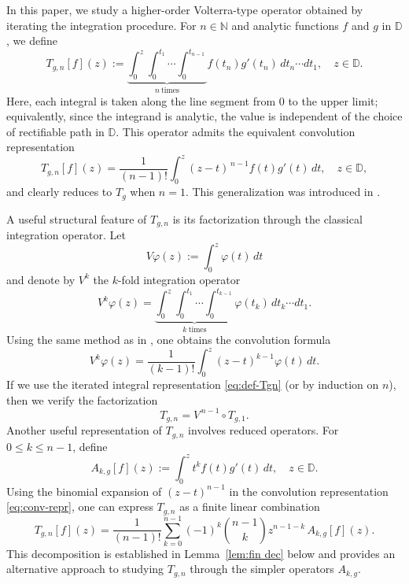 \documentclass[preprint,12pt]{elsarticle}
\numberwithin{equation}{section}
\theoremstyle{remark}
\begin{document}
In this paper, we study a higher-order Volterra-type operator obtained by iterating the integration procedure. For $n\in\mathbb{N}$ and analytic functions $f$ and $g$ in $\mathbb{D}$, we define \begin{equation}\label{eq:def-Tgn} T_{g,n}[f](z) :=\underbrace{\int_0^z\int_0^{t_1}\cdots\int_0^{t_{n-1}}}_{n\ \text{times}} f(t_n)g'(t_n)\,dt_n\cdots dt_1, \quad z\in\mathbb{D}. \end{equation} Here, each integral is taken along the line segment from $0$ to the upper limit; equivalently, since the integrand is analytic, the value is independent of the choice of rectifiable path in $\mathbb{D}$. This operator admits the equivalent convolution representation \begin{equation}\label{eq:conv-repr} T_{g,n}[f](z)=\frac{1}{(n-1)!}\int_0^z (z-t)^{\,n-1}f(t)g'(t)\,dt, \quad z\in\mathbb{D}, \end{equation} and clearly reduces to $T_g$ when $n=1$. This generalization was introduced in \cite{Kar-Volterra}.

A useful structural feature of $T_{g,n}$ is its factorization through the classical integration operator. Let \begin{equation*} V\varphi(z):=\int_0^z \varphi(t)\,dt \end{equation*} and denote by $V^k$ the $k$-fold integration operator \begin{equation}\label{V-k} V^k\varphi(z)=\underbrace{\int_0^z\int_0^{t_1}\cdots\int_0^{t_{k-1}}}_{k\ \text{times}} \varphi(t_k)\,dt_k\cdots dt_1. \end{equation} Using the same method as in \cite[Proposition 4.1]{Kar-Volterra}, one obtains the convolution formula \begin{equation}\label{eq:Vk-conv} V^k\varphi(z)=\frac{1}{(k-1)!}\int_0^z (z-t)^{k-1}\varphi(t)\,dt. \end{equation} If we use the iterated integral representation \eqref{eq:def-Tgn} (or by induction on $n$), then we verify the factorization \begin{equation}\label{eq:factorization} T_{g,n}=V^{\,n-1}\circ T_{g,1}. \end{equation} Another useful representation of $T_{g,n}$ involves reduced operators. For $0\le k\le n-1$, define \begin{equation}\label{Ak} A_{k,g}[f](z):=\int_0^z t^{k} f(t)g'(t)\,dt,\quad z\in\mathbb{D}. \end{equation} Using the binomial expansion of $(z-t)^{n-1}$ in the convolution representation \eqref{eq:conv-repr}, one can express $T_{g,n}$ as a finite linear combination \begin{equation}\label{eq:Tn-reduced} T_{g,n}[f](z)=\frac{1}{(n-1)!}\sum_{k=0}^{n-1} (-1)^k\binom{n-1}{k} z^{n-1-k}\,A_{k,g}[f](z). \end{equation} This decomposition is established in Lemma~\ref{lem:fin dec} below and provides an alternative approach to studying $T_{g,n}$ through the simpler operators $A_{k,g}$.
\end{document}
